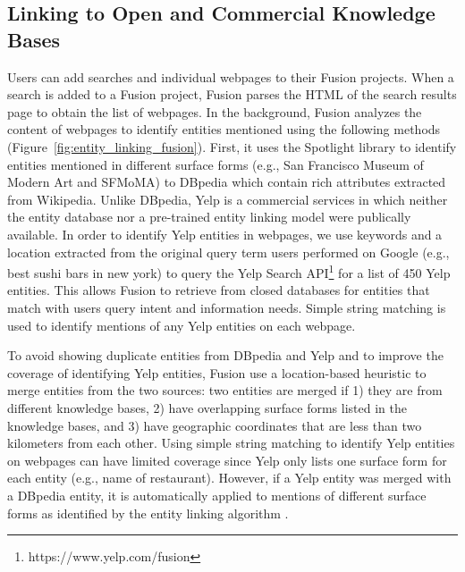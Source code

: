 \subsection{Linking to Open and Commercial Knowledge Bases}
Users can add searches and individual webpages to their Fusion projects. When a search is added to a Fusion project, Fusion parses the HTML of the search results page to obtain the list of webpages. In the background, Fusion analyzes the content of webpages to identify entities mentioned using the following methods (Figure~\ref{fig:entity_linking_fusion}). First, it uses the Spotlight library \cite{spotlight} to identify entities mentioned in different surface forms (e.g., San Francisco Museum of Modern Art and SFMoMA) to DBpedia which contain rich attributes extracted from Wikipedia. Unlike DBpedia, Yelp is a commercial services in which neither the entity database nor a pre-trained entity linking model were publically available. In order to identify Yelp entities in webpages, we use keywords and a location extracted from the original query term users performed on Google (e.g., best sushi bars in new york) to query the Yelp Search API\footnote{https://www.yelp.com/fusion} for a list of 450 Yelp entities. This allows Fusion to retrieve from closed databases for entities that match with users query intent and information needs. Simple string matching is used to identify mentions of any Yelp entities on each webpage.

To avoid showing duplicate entities from DBpedia and Yelp and to improve the coverage of identifying Yelp entities, Fusion use a location-based heuristic to merge entities from the two sources: two entities are merged if 1) they are from different knowledge bases, 2) have overlapping surface forms listed in the knowledge bases, and 3) have geographic coordinates that are less than two kilometers from each other. Using simple string matching to identify Yelp entities on webpages can have limited coverage since Yelp only lists one surface form for each entity (e.g., name of restaurant). However, if a Yelp entity was merged with a DBpedia entity, it is automatically applied to mentions of different surface forms as identified by the entity linking algorithm \cite{spotlight}.

